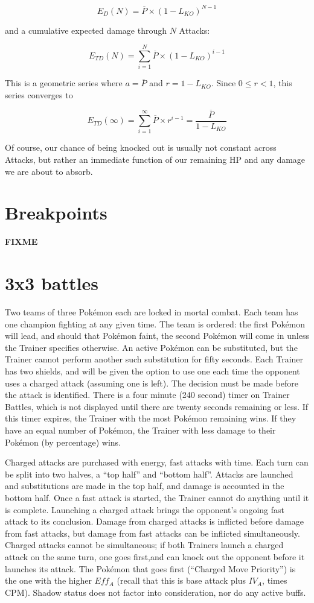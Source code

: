 \[ E_D(N) = \overline{P} \times (1 - L_{KO})^{N-1} \]

and a cumulative expected damage through $N$ Attacks:

\[ E_{TD}(N) = \sum^N_{i=1} \overline{P} \times (1 - L_{KO})^{i-1} \]

This is a geometric series where $a = \overline{P}$ and $r = 1 - L_{KO}$.
Since $0 \leq r < 1$, this series converges to

\[ E_{TD}(\infty) = \sum^\infty_{i=1} \overline{P} \times r^{i-1} = \frac{\overline{P}}{1 - L_{KO}} \]

Of course, our chance of being knocked out is usually not constant across
 Attacks, but rather an immediate function of our remaining HP and any
 damage we are about to absorb.

\section{Breakpoints}
\label{sec:breakpoints}
\textbf{FIXME}

\section{3x3 battles}
\label{sec:3x3}
Two teams of three Pokémon each are locked in mortal combat.
Each team has one champion fighting at any given time.
The team is ordered: the first Pokémon will lead, and should that Pokémon
  faint, the second Pokémon will come in unless the Trainer specifies otherwise.
An active Pokémon can be substituted, but the Trainer cannot perform another
  such substitution for fifty seconds.
Each Trainer has two shields, and will be given the option to use one each time
  the opponent uses a charged attack (assuming one is left).
The decision must be made before the attack is identified.
There is a four minute (240 second) timer on Trainer Battles, which is not displayed
  until there are twenty seconds remaining or less.
If this timer expires, the Trainer with the most Pokémon remaining wins.
If they have an equal number of Pokémon, the Trainer with less damage to their
  Pokémon (by percentage) wins.

Charged attacks are purchased with energy, fast attacks with time.
Each turn can be split into two halves, a ``top half'' and ``bottom half''.
Attacks are launched and substitutions are made in the top half, and damage is accounted in the bottom half.
Once a fast attack is started, the Trainer cannot do anything until it is complete.
Launching a charged attack brings the opponent's ongoing fast attack to its conclusion.
Damage from charged attacks is inflicted before damage from fast attacks,
  but damage from fast attacks can be inflicted simultaneously.
Charged attacks cannot be simultaneous; if both Trainers launch a charged attack
  on the same turn, one goes first,and can knock out the opponent before it
  launches its attack.
The Pokémon that goes first (``Charged Move Priority'') is the one with the
  higher $Eff_A$ (recall that this is base attack plus $IV_A$, times CPM).
Shadow status does not factor into consideration, nor do any active buffs.

